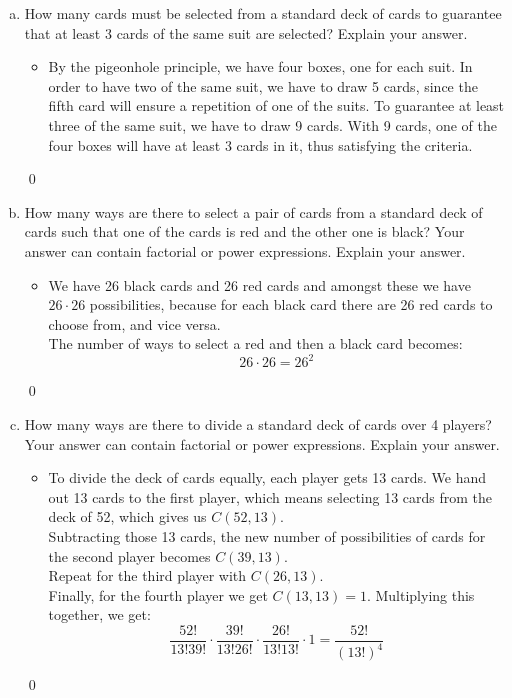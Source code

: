 \documentclass[12pt]{article}
\begin{document}
\begin{enumerate}[a)]
\item How many cards must be selected from a standard deck of cards to
  guarantee that at least 3 cards of the same suit are selected?
  Explain your answer.

  \begin{itemize}
  \item By the pigeonhole principle, we have four boxes, one for each suit. In order to have two of the same suit, we have to draw 5 cards, since the fifth card will ensure a repetition of one of the suits. To guarantee at least three of the same suit, we have to draw 9 cards. With 9 cards, one of the four boxes will have at least 3 cards in it, thus satisfying the criteria.
  \end{itemize}
  \qed
  \medskip
  

\item How many ways are there to select a pair of cards from a
  standard deck of cards such that one of the cards is red and the
  other one is black? Your answer can contain factorial or power
  expressions. Explain your answer.

  \begin{itemize}
  \item We have 26 black cards and 26 red cards and amongst these we have $26 \cdot 26$ possibilities, because for each black card there are 26 red cards to choose from, and vice versa. \\
    The number of ways to select a red and then a black card becomes: \\
    $$26\cdot 26 = 26^2 $$

    
  \end{itemize}
  \qed

\medskip


\item How many ways are there to divide a standard deck of cards over
  4 players? Your answer can contain factorial or power
  expressions. Explain your answer.

  \begin{itemize}
  \item To divide the deck of cards equally, each player gets 13 cards. We hand out 13 cards to the first player, which means selecting 13 cards from the deck of 52, which gives us $C(52,13)$. \\
    Subtracting those 13 cards, the new number of possibilities of cards for the second player becomes $C(39,13)$. \\
    Repeat for the third player with $C(26,13)$. \\
    Finally, for the fourth player we get $C(13,13) = 1$. Multiplying this together, we get: \\

    $$
    \frac{52!}{13!39!} \cdot \frac{39!}{13!26!} \cdot \frac{26!}{13!13!} \cdot 1 = \frac{52!}{(13!)^4}
    $$

    
  \end{itemize}
  \qed

\end{enumerate}
\end{document}
